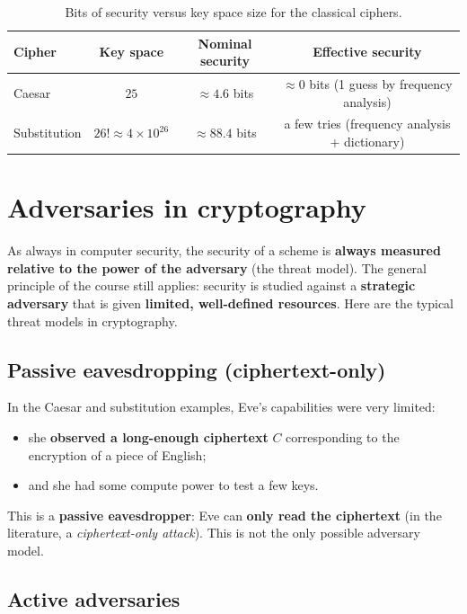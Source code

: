 \begin{table}[h]
\centering
\begin{tabular}{@{}lccc@{}}
\toprule
\textbf{Cipher} & \textbf{Key space} & \textbf{Nominal security} & \textbf{Effective security} \\
\midrule
Caesar & $25$ & $\approx 4.6$ bits & $\approx 0$ bits (1 guess by frequency analysis) \\
Substitution & $26! \approx 4 \times 10^{26}$ & $\approx 88.4$ bits & a few tries (frequency analysis + dictionary) \\
\bottomrule
\end{tabular}
\caption{Bits of security versus key space size for the classical ciphers.}
\end{table}

\section{Adversaries in cryptography}

As always in computer security, the security of a scheme is \textbf{always measured relative to the power of the adversary} (the threat model). The general principle of the course still applies: security is studied against a \textbf{strategic adversary} that is given \textbf{limited, well-defined resources}. Here are the typical threat models in cryptography.

\subsection{Passive eavesdropping (ciphertext-only)}

In the Caesar and substitution examples, Eve's capabilities were very limited:
\begin{itemize}
    \item she \textbf{observed a long-enough ciphertext} $C$ corresponding to the encryption of a piece of English;
    \item and she had some compute power to test a few keys.
\end{itemize}
This is a \textbf{passive eavesdropper}: Eve can \textbf{only read the ciphertext} (in the literature, a \emph{ciphertext-only attack}). This is not the only possible adversary model.

\subsection{Active adversaries}

